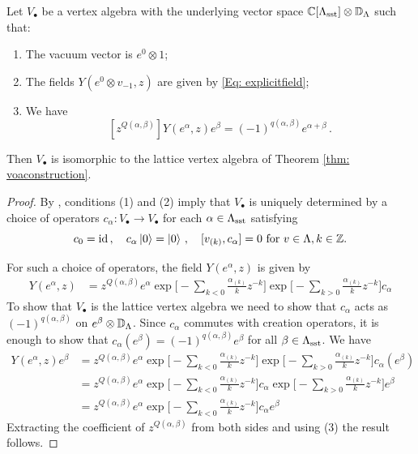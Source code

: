 \documentclass[a4paper, 12pt]{amsart}
\begin{document}
\begin{proposition}
\label{Cor: calpha}
    Let $V_{\bullet}$ be a vertex algebra with the underlying vector space ${\mathbb{C}}[\Lambda_{\text{sst}}]\otimes {\mathbb{D}}_{\Lambda}$ such that:
    \begin{enumerate}
    \item[(i)] The vacuum vector is $e^0\otimes 1$; 
    \item[(ii)] The fields $Y(e^0\otimes v_{-1}, z)$ are given by \eqref{Eq: explicitfield};
    \item[(iii)] We have
        \begin{equation}
    \label{Eq: calpha}
    [z^{Q(\alpha,\beta)}] Y(e^{\alpha},z)e^{\beta}=(-1)^{q(\alpha, \beta)}e^{\alpha+\beta}\,.
    \end{equation}
    \end{enumerate} 
Then $V_\bullet$ is isomorphic to the lattice vertex algebra of Theorem \ref{thm: voaconstruction}.
\end{proposition}
\begin{proof}
By \cite[Proposition 5.4]{Ka98}, conditions (1) and (2) imply that $V_\bullet$ is uniquely determined by a choice of operators $c_\alpha\colon V_\bullet\to V_\bullet$ for each $\alpha\in \Lambda_{\text{sst}}$ satisfying 
\[c_0=\operatorname{id}\,, \quad c_\alpha\ket{0}=\ket{0}\, , \quad [v_{(k)}, c_\alpha]=0\textup{ for }v\in \Lambda, k\in {\mathbb{Z}}.\]

For such a choice of operators, the field $Y(e^\alpha, z)$ is given by 
\begin{align*}
 Y(e^{\alpha},z) &=z^{Q(\alpha,\beta)}e^{\alpha} \exp\Big[-\sum_{ k<0}\frac{\alpha_{(k)}}{k}z^{-k}\Big]\exp\Big[-\sum_{k>0}\frac{\alpha_{(k)}}{k}z^{-k}\Big]c_\alpha
\end{align*}
To show that $V_\bullet$ is the lattice vertex algebra we need to show that $c_\alpha$ acts as $(-1)^{q(\alpha, \beta)}$ on $e^\beta\otimes {\mathbb{D}}_\Lambda$. Since $c_\alpha$ commutes with creation operators, it is enough to show that $c_\alpha(e^\beta)=(-1)^{q(\alpha,\beta)}e^{\beta}$ for all $\beta\in \Lambda_{\text{sst}}$.  We have
\begin{align*}
Y(e^\alpha, z)e^\beta&=z^{Q(\alpha,\beta)}e^{\alpha} \exp\Big[-\sum_{ k<0}\frac{\alpha_{(k)}}{k}z^{-k}\Big]\exp\Big[-\sum_{k>0}\frac{\alpha_{(k)}}{k}z^{-k}\Big]c_\alpha(e^\beta)\\
&=z^{Q(\alpha,\beta)}e^{\alpha} \exp\Big[-\sum_{ k<0}\frac{\alpha_{(k)}}{k}z^{-k}\Big]c_\alpha\exp\Big[-\sum_{k>0}\frac{\alpha_{(k)}}{k}z^{-k}\Big]e^\beta\\
&=z^{Q(\alpha,\beta)}e^{\alpha} \exp\Big[-\sum_{ k<0}\frac{\alpha_{(k)}}{k}z^{-k}\Big]c_\alpha e^\beta
\end{align*}
Extracting the coefficient of $z^{Q(\alpha, \beta)}$ from both sides and using (3) the result follows. \qedhere
\end{proof}
\end{document}
